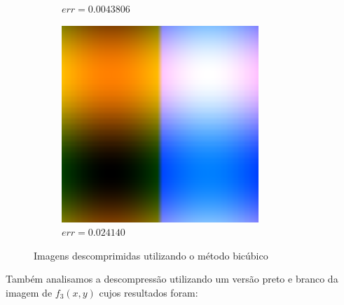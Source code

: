 \documentclass[12pt, a4paper]{article}
\begin{document}
\begin{figure}[h!]
\begin{subfigure}{.3\textwidth}
            \caption{$err = 0.0043806$}
        \end{subfigure}
        \begin{subfigure}{.3\textwidth}
            \includegraphics[width=.95\textwidth]{../trdFunBC.png}
            \caption{$err = 0.024140$}
        \end{subfigure}
        \caption{Imagens descomprimidas utilizando o método bicúbico}
    \end{figure}
    Também analisamos a descompressão utilizando um versão preto e branco da imagem
    de $f_3(x,y)$ cujos resultados foram:
\end{document}
